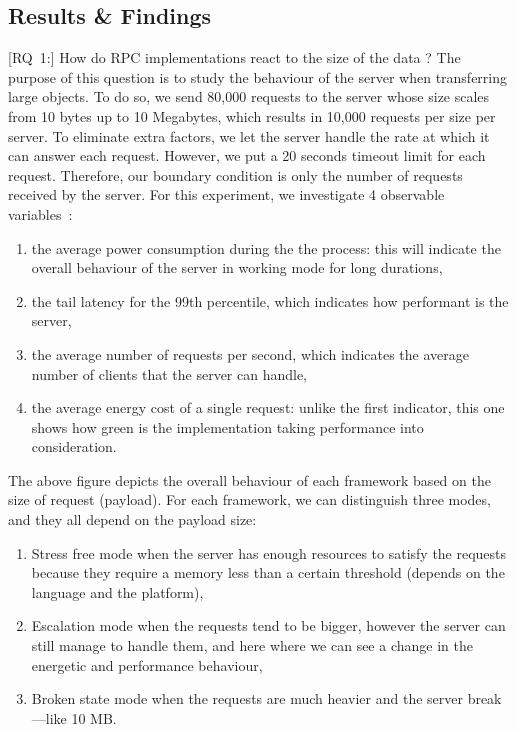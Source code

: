 \subsection{Results \& Findings}
[\textsc{RQ}~1:] How do RPC implementations react to the size of the data ?
The purpose of this question is to study the behaviour of the server when transferring large objects.
To do so, we send 80,000 requests to the server whose size scales from 10 bytes up to 10 Megabytes, which results in 10,000 requests per size per server.
To eliminate extra factors, we let the server handle the rate at which it can answer each request.
However, we put a 20 seconds timeout limit for each request.
Therefore, our boundary condition is only the number of requests received by the server.
For this experiment, we investigate 4 observable variables~:
\begin{enumerate}
    \item the \textsf{average power consumption} during the the process: this will indicate the overall behaviour of the server in working mode for long durations,
    \item the \textsf{tail latency} for the 99th percentile, which indicates how performant is the server,
    \item the \textsf{average number of requests per second}, which indicates the average number of clients that the server can handle,
    \item the \textsf{average energy cost} of a single request: unlike the first indicator, this one shows how green is the implementation taking performance into consideration.
\end{enumerate}

The above figure depicts the overall behaviour of each framework based on the size of request (payload).
For each framework, we can distinguish three modes, and they all depend on the payload size:
\begin{enumerate}
    \item \textsf{Stress free} mode when the server has enough resources to satisfy the requests because they require a memory less than a certain threshold (depends on the language and the platform),
    \item \textsf{Escalation} mode when the requests tend to be bigger, however the server can still manage to handle them, and here where we can see a change in the energetic and performance behaviour,
    \item \textsf{Broken state} mode when the requests are much heavier and the server break—like 10 MB.%
\end{enumerate}

